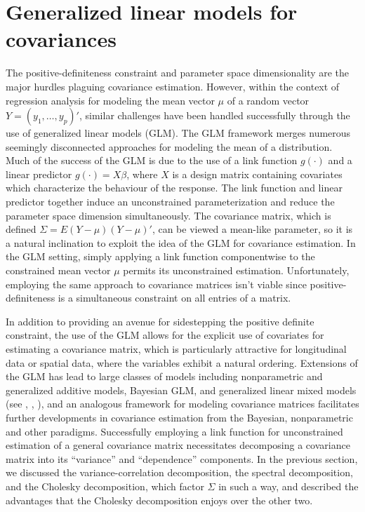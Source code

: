 \section{Generalized linear models for covariances} \label{covariance-glms}


The positive-definiteness constraint and parameter space dimensionality are the major hurdles plaguing covariance estimation. However, within the context of regression analysis for modeling the mean vector $\mu$ of a random vector $Y = \left(y_1, \dots , y_p\right)'$, similar challenges have been handled successfully through the use of generalized linear models (GLM). The GLM framework \cite{McCullagh1989} merges numerous seemingly disconnected approaches for modeling the mean of a distribution. Much of the success of the GLM is due to the use of a link function $g\left(\cdot\right)$ and a linear predictor $g\left(\cdot\right) = X\beta$, where $X$ is a design matrix containing covariates which characterize the behaviour of the response. The link function and linear predictor together induce an unconstrained parameterization and reduce the parameter space dimension simultaneously.  The covariance matrix, which is defined $\Sigma = E\left(Y - \mu\right)\left(Y - \mu\right)'$, can be viewed a mean-like parameter, so it is a natural inclination to exploit the idea of the GLM for covariance estimation. In the GLM setting, simply applying a link function componentwise to the constrained mean vector $\mu$ permits its unconstrained estimation. Unfortunately, employing the same approach to covariance matrices isn't viable since positive-definiteness is a simultaneous constraint on all entries of a matrix. 

\bigskip

In addition to providing an avenue for sidestepping the positive definite constraint, the use of the GLM allows for the explicit use of covariates for estimating a covariance matrix, which is particularly attractive for longitudinal data or spatial data, where the variables exhibit a natural ordering. Extensions of the GLM has lead to large classes of models including nonparametric and generalized additive models, Bayesian GLM, and generalized linear mixed models (see \citep{hastie1990generalized},  \citep{dey2000generalized},  \citep{mcculloch2001generalized}), and an analogous framework for modeling covariance matrices facilitates further developments in covariance estimation from the Bayesian, nonparametric and other paradigms. Successfully employing a link function for unconstrained estimation of a general covariance matrix necessitates decomposing a covariance matrix into its ``variance'' and ``dependence'' components. In the previous section, we discussed  the variance-correlation decomposition, the spectral decomposition, and the Cholesky decomposition, which factor $\Sigma$ in such a way, and described the advantages that the Cholesky decomposition enjoys over the other two.  

